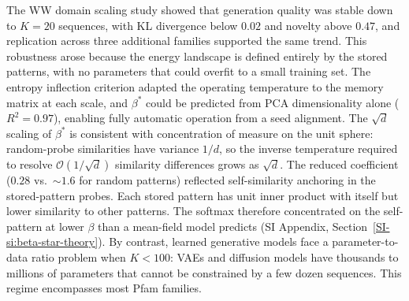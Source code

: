 \documentclass[11pt,onecolumn,twoside,lineno]{pnas-new}
\begin{document}
The WW domain scaling study showed that generation quality was stable down to $K{=}20$ sequences, with KL divergence below $0.02$ and novelty above $0.47$, and replication across three additional families supported the same trend. This robustness arose because the energy landscape is defined entirely by the stored patterns, with no parameters that could overfit to a small training set. The entropy inflection criterion adapted the operating temperature to the memory matrix at each scale, and $\beta^*$ could be predicted from PCA dimensionality alone ($R^2{=}0.97$), enabling fully automatic operation from a seed alignment. The $\sqrt{d}$ scaling of $\beta^*$ is consistent with concentration of measure on the unit sphere: random-probe similarities have variance $1/d$, so the inverse temperature required to resolve $\mathcal{O}(1/\sqrt{d})$ similarity differences grows as $\sqrt{d}$. The reduced coefficient ($0.28$ vs.\ ${\sim}1.6$ for random patterns) reflected self-similarity anchoring in the stored-pattern probes. Each stored pattern has unit inner product with itself but lower similarity to other patterns. The softmax therefore concentrated on the self-pattern at lower $\beta$ than a mean-field model predicts (SI Appendix, Section~\ref{SI-si:beta-star-theory}). By contrast, learned generative models face a parameter-to-data ratio problem when $K < 100$: VAEs and diffusion models have thousands to millions of parameters that cannot be constrained by a few dozen sequences. This regime encompasses most Pfam families.
\end{document}
